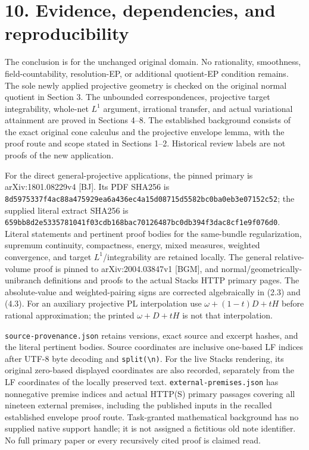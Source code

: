 \documentclass[
  10pt,
]{article}
\begin{document}
\section{10. Evidence, dependencies, and
reproducibility}\label{evidence-dependencies-and-reproducibility}

The conclusion is for the unchanged original domain. No rationality,
smoothness, field-countability, resolution-EP, or additional quotient-EP
condition remains. The sole newly applied projective geometry is checked
on the original normal quotient in Section 3. The unbounded
correspondences, projective target integrability, whole-net \(L^1\)
argument, irrational transfer, and actual variational attainment are
proved in Sections 4--8. The established background consists of the
exact original cone calculus and the projective envelope lemma, with the
proof route and scope stated in Sections 1--2. Historical review labels
are not proofs of the new application.

For the direct general-projective applications, the pinned primary is
arXiv:1801.08229v4 {[}BJ{]}. Its PDF SHA256 is
\texttt{8d5975337f4ac88a475929ea6a436ec4a15d08715d5582bc0ba0eb3e07152c52};
the supplied literal extract SHA256 is
\texttt{659bb8d2e5335781041f03cdb168bac70126487bc0db394f3dac8cf1e9f076d0}.
Literal statements and pertinent proof bodies for the same-bundle
regularization, supremum continuity, compactness, energy, mixed
measures, weighted convergence, and target \(L^1\)/integrability are
retained locally. The general relative-volume proof is pinned to
arXiv:2004.03847v1 {[}BGM{]}, and normal/geometrically-unibranch
definitions and proofs to the actual Stacks HTTP primary pages. The
absolute-value and weighted-pairing signs are corrected algebraically in
(2.3) and (4.3). For an auxiliary projective PL interpolation use
\(\omega+(1-t)D+tH\) before rational approximation; the printed
\(\omega+D+tH\) is not that interpolation.

\texttt{source-provenance.json} retains versions, exact source and
excerpt hashes, and the literal pertinent bodies. Source coordinates are
inclusive one-based LF indices after UTF-8 byte decoding and
\texttt{split(\textquotesingle{}\textbackslash{}n\textquotesingle{})}.
For the live Stacks rendering, its original zero-based displayed
coordinates are also recorded, separately from the LF coordinates of the
locally preserved text. \texttt{external-premises.json} has nonnegative
premise indices and actual HTTP(S) primary passages covering all
nineteen external premises, including the published inputs in the
recalled established envelope proof route. Task-granted mathematical
background has no supplied native support handle; it is not assigned a
fictitious old note identifier. No full primary paper or every
recursively cited proof is claimed read.
\end{document}
